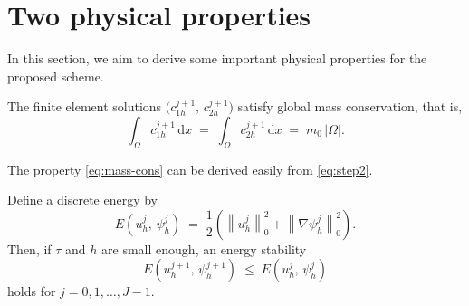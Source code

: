 
\section{Two physical properties}
\label{sec:physical}

In this section, we aim to derive some important physical properties for the proposed scheme.

\begin{theorem}
\label{thm:mass}
The finite element solutions $\bigl(c_{1h}^{j+1},\, c_{2h}^{j+1}\bigr)$ satisfy global mass
conservation, that is,
\begin{equation}
  \int_{\Omega} c_{1h}^{j+1}\,\mathrm{d}x
  \;=\;
  \int_{\Omega} c_{2h}^{j+1}\,\mathrm{d}x
  \;=\;
  m_{0}\,|\Omega|.
  \label{eq:mass-cons}
\end{equation}
\end{theorem}

The property \eqref{eq:mass-cons} can be derived easily from \eqref{eq:step2}.

\begin{theorem}
\label{thm:energy}
Define a discrete energy by
\begin{equation}
  E\!\left(u_{h}^{j},\,\psi_{h}^{j}\right)
  \;=\;
  \frac{1}{2}\left(
    \left\|u_{h}^{j}\right\|_{0}^{2}
    +
    \left\|\nabla\psi_{h}^{j}\right\|_{0}^{2}
  \right).
  \label{eq:energy-def}
\end{equation}
Then, if $\tau$ and $h$ are small enough, an energy stability
\begin{equation}
  E\!\left(u_{h}^{j+1},\,\psi_{h}^{j+1}\right)
  \;\leq\;
  E\!\left(u_{h}^{j},\,\psi_{h}^{j}\right)
  \label{eq:energy-stab}
\end{equation}
holds for $j = 0, 1, \ldots, J-1$.
\end{theorem}

